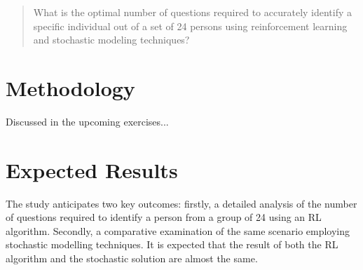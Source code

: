 \begin{quote}
	What is the optimal number of questions required to accurately identify a specific individual out of a set of 24 persons using reinforcement learning and stochastic modeling techniques?
\end{quote}


\section{Methodology}

Discussed in the upcoming exercises...

\section{Expected Results}

The study anticipates two key outcomes: firstly, a detailed analysis of the number of questions required to identify a person from a group of 24 using an RL algorithm. Secondly, a comparative examination of the same scenario employing stochastic modelling techniques. It is expected that the result of both the RL algorithm and the stochastic solution are almost the same.

